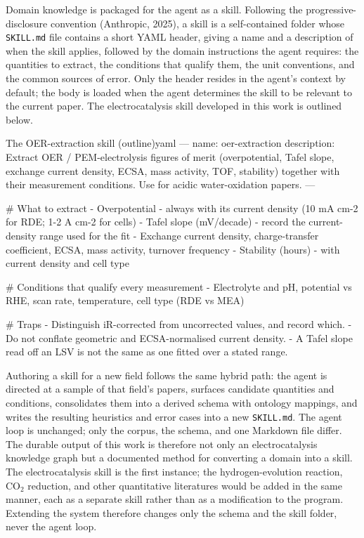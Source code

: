 \documentclass{template}
\begin{document}
Domain knowledge is packaged for the agent as a skill. Following the progressive-disclosure convention (Anthropic, 2025), a skill is a self-contained folder whose \texttt{SKILL.md} file contains a short YAML header, giving a name and a description of when the skill applies, followed by the domain instructions the agent requires: the quantities to extract, the conditions that qualify them, the unit conventions, and the common sources of error. Only the header resides in the agent's context by default; the body is loaded when the agent determines the skill to be relevant to the current paper. The electrocatalysis skill developed in this work is outlined below.

\begin{codebox}{The OER-extraction skill (outline)}{yaml}
---
name: oer-extraction
description: Extract OER / PEM-electrolysis figures of merit (overpotential,
  Tafel slope, exchange current density, ECSA, mass activity, TOF, stability)
  together with their measurement conditions. Use for acidic water-oxidation papers.
---

# What to extract
- Overpotential - always with its current density (10 mA cm-2 for RDE; 1-2 A cm-2 for cells)
- Tafel slope (mV/decade) - record the current-density range used for the fit
- Exchange current density, charge-transfer coefficient, ECSA, mass activity, turnover frequency
- Stability (hours) - with current density and cell type

# Conditions that qualify every measurement
- Electrolyte and pH, potential vs RHE, scan rate, temperature, cell type (RDE vs MEA)

# Traps
- Distinguish iR-corrected from uncorrected values, and record which.
- Do not conflate geometric and ECSA-normalised current density.
- A Tafel slope read off an LSV is not the same as one fitted over a stated range.
\end{codebox}

Authoring a skill for a new field follows the same hybrid path: the agent is directed at a sample of that field's papers, surfaces candidate quantities and conditions, consolidates them into a derived schema with ontology mappings, and writes the resulting heuristics and error cases into a new \texttt{SKILL.md}. The agent loop is unchanged; only the corpus, the schema, and one Markdown file differ. The durable output of this work is therefore not only an electrocatalysis knowledge graph but a documented method for converting a domain into a skill. The electrocatalysis skill is the first instance; the hydrogen-evolution reaction, CO$_2$ reduction, and other quantitative literatures would be added in the same manner, each as a separate skill rather than as a modification to the program. Extending the system therefore changes only the schema and the skill folder, never the agent loop.
\end{document}
